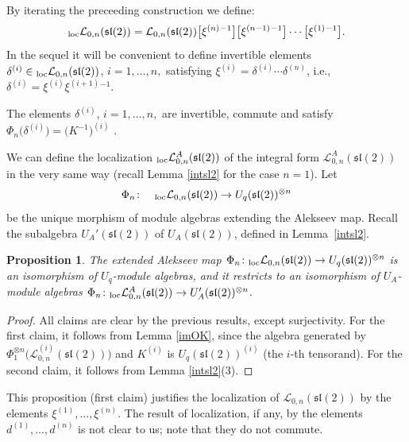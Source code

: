 \documentclass[pdftex]{sigma}%
\numberwithin{equation}{section}
\numberwithin{figure}{section}
\newtheorem{prop}[teo]{Proposition}
\newcommand{\Ll}{{\mathcal L}}
\newcommand{\ra}{\rightarrow}
\begin{document}
\begin{defi}\label{Lonloc}
By iterating the preceeding construction we define:
\[
{}_{\rm loc}\Ll_{0,n}({\mathfrak{sl}}(2))=\Ll_{0,n}({\mathfrak{sl}}(2))\big[\xi^{(n)}{}^{-1}\big] \big[\xi^{(n-1)}{}^{-1}\big]\cdots \big[\xi^{(1)}{}^{-1}\big].
\]
In the sequel it will be convenient to define invertible elements $\delta^{(i)}\in {}_{\rm loc}\Ll_{0,n}({\mathfrak{sl}}(2))$, $i=1,\dots,n,$ satisfying
$\xi^{(i)}=\delta^{(i)}\cdots\delta^{(n)}$, i.e., $\delta^{(i)}=\xi^{(i)}\xi^{(i+1)}{}^{-1}$.
\end{defi}
The elements $\delta^{(i)}$, $i=1,\dots,n,$ are invertible, commute and satisfy $\Phi_n\big(\delta^{(i)}\big) = \big(K^{-1}\big)^{(i)}$ .

We can define the localization ${}_{\rm loc}\Ll_{0,n}^A({\mathfrak{sl}}(2))$ of the integral form $\Ll_{0,n}^A({\mathfrak{sl}}(2))$ in the very same way (recall Lemma \ref{intsl2} for the case $n=1$). Let
\[
\Phi_n\colon\quad {}_{\rm loc}\Ll_{0,n}({\mathfrak{sl}}(2))\ra U_q({\mathfrak{sl}}(2))^{{\otimes} n}
\]
be the unique morphism of module algebras extending the Alekseev map. Recall the subalgebra $U_A'({\mathfrak{sl}}(2))$ of $U_A({\mathfrak{sl}}(2))$, defined in Lemma~\ref{intsl2}.
\begin{prop}\label{Alekseevsl2loc} The extended Alekseev map $\Phi_n\colon {}_{\rm loc}\Ll_{0,n}({\mathfrak{sl}}(2))\ra U_q({\mathfrak{sl}}(2))^{{\otimes} n}$ is an isomorphism of $U_q$-module algebras, and it restricts to an isomorphism of $U_A$-module algebras $\Phi_n\colon {}_{\rm loc}\Ll_{0,n}^A({\mathfrak{sl}}(2))\ra U_A'({\mathfrak{sl}}(2))^{{\otimes} n}$.
\end{prop}
\begin{proof} All claims are clear by the previous results, except surjectivity. For the first claim, it follows from Lemma \ref{imOK}, since the algebra generated by $\Phi_1^{\otimes n}\big(\Ll_{0,n}^{(i)}({\mathfrak{sl}}(2))\big)$ and $K^{(i)}$ is $U_q({\mathfrak{sl}}(2))^{(i)}$ (the $i$-th tensorand). For the second claim, it follows from Lemma \ref{intsl2}(3).\end{proof}

\begin{remk} {\rm This proposition (first claim) justifies the localization of $\Ll_{0,n}({\mathfrak{sl}}(2))$ by the elements $\xi^{(1)},\dots,\xi^{(n)}$. The result of localization, if any, by the elements $d^{(1)},\dots,d^{(n)}$ is not clear to us; note that they do not commute.}
\end{remk}
\end{document}
